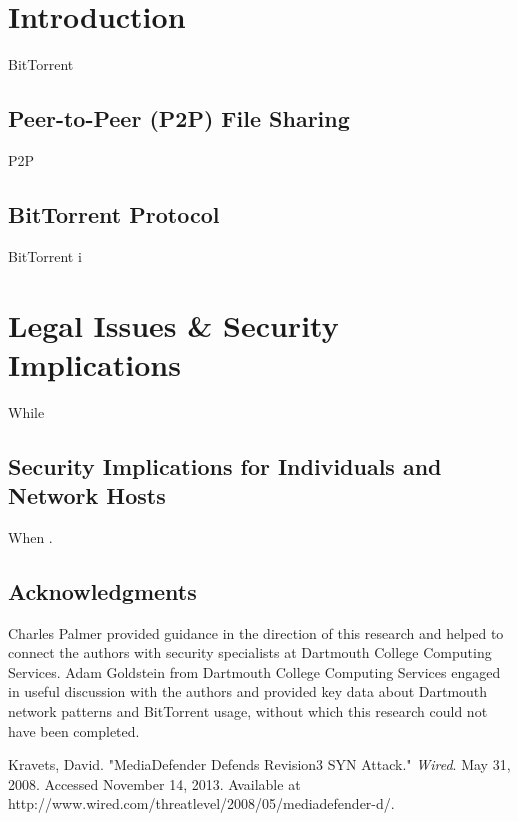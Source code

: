 \documentclass[11pt]{article}
\begin{document}
\pagebreak
\begin{multicols}{2}
\section{Introduction}

BitTorrent 

\subsection{Peer-to-Peer (P2P) File Sharing}

P2P 

\subsection{BitTorrent Protocol}

BitTorrent i


\section{Legal Issues \& Security Implications}

While 

\subsection{Security Implications for Individuals and Network Hosts}

When \cite{mediadefender}.



\subsection*{Acknowledgments}
Charles Palmer provided guidance in the direction of this research and helped to connect the authors with security specialists at Dartmouth College Computing Services. Adam Goldstein from Dartmouth College Computing Services engaged in useful discussion with the authors and provided key data about Dartmouth network patterns and BitTorrent usage, without which this research could not have been completed.
\end{multicols}

\pagebreak

\begin{thebibliography}{99}

 Kravets, David. "MediaDefender Defends Revision3 SYN Attack." \emph{Wired}. May 31, 2008. Accessed November 14, 2013. Available at http://www.wired.com/threatlevel/2008/05/mediadefender-d/.

\end{thebibliography}
\end{document}
